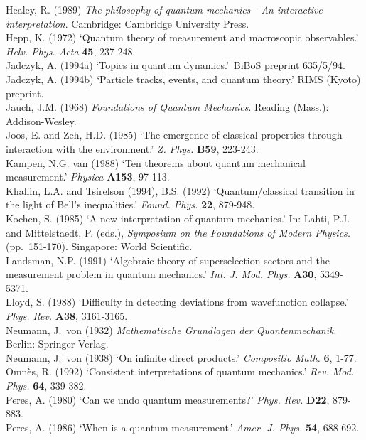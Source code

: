 \documentclass[12pt,titlepage]{article}
\begin{document}
Healey, R. (1989) {\em The philosophy of quantum mechanics - An interactive
interpretation}.
Cambridge: Cambridge  University Press.\\
 Hepp, K. (1972)  `Quantum theory of measurement and macroscopic
observables.' {\em Helv. Phys. Acta} {\bf 45},  237-248.\\
Jadczyk, A. (1994a) `Topics in quantum dynamics.'\ BiBoS preprint 635/5/94.\\
Jadczyk, A. (1994b) `Particle tracks, events, and quantum theory.' RIMS (Kyoto)
preprint.\\
 Jauch, J.M. (1968) {\em Foundations of Quantum Mechanics}.
 Reading (Mass.): Addison-Wesley.\\
 Joos, E. and Zeh, H.D.  (1985) `The emergence of classical properties
through interaction with the environment.' {\em Z. Phys.} {\bf B59}, 223-243.\\
Kampen, N.G. van (1988) `Ten theorems about quantum mechanical
measurement.'  {\em  Physica} {\bf A153},  97-113.\\
  Khalfin, L.A. and  Tsirelson (1994), B.S. (1992)  `Quantum/classical
transition in the light of Bell's
inequalities.'  {\em Found. Phys.} {\bf 22},  879-948.\\
Kochen,  S. (1985) `A new interpretation of quantum mechanics.' In:
Lahti,  P.J. and Mittelstaedt,  P. (eds.), {\em  Symposium on the Foundations
of Modern Physics.}
(pp.\ 151-170).  Singapore: World Scientific.\\
  Landsman, N.P. (1991)  `Algebraic theory of superselection sectors and the
measurement problem
in quantum mechanics.' {\em Int. J. Mod. Phys.} {\bf A30},  5349-5371.\\
 Lloyd, S. (1988)  `Difficulty in detecting deviations from wavefunction
collapse.'
 {\em Phys. Rev.} {\bf A38},  3161-3165.\\
 Neumann, J.~von (1932) {\em Mathematische Grundlagen der
Quantenmechanik}.  Berlin: Springer-Verlag.\\
 Neumann, J.~von (1938) `On infinite direct products.' {\em Compositio Math.}
{\bf 6}, 1-77.\\
  Omn\`{e}s, R. (1992)
`Consistent interpretations of quantum mechanics.' {\em Rev. Mod. Phys.} {\bf
64},  339-382.\\
  Peres, A. (1980) `Can we undo quantum measurements?' {\em Phys. Rev.} {\bf
D22},  879-883.\\
  Peres, A. (1986) `When is a quantum measurement.' {\em  Amer. J. Phys.} {\bf
54},  688-692.\\
\end{document}
